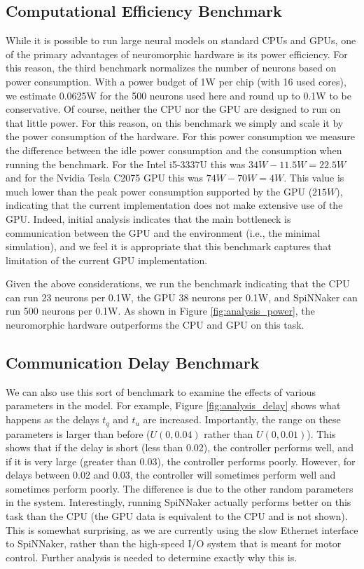 \documentclass{frontiersSCNS} %
\begin{document}
\subsection{Computational Efficiency Benchmark}

While it is possible to run large neural models on standard CPUs and GPUs,
one of the primary advantages of neuromorphic hardware is its power
efficiency.  For this reason, the third benchmark normalizes the number of neurons
based on power consumption.  With a power budget of 1W per chip (with 16 used cores),
we estimate 0.0625W for the 500 neurons used here and round up to 0.1W to be
conservative.  Of course, neither the CPU nor the
GPU are designed to run on that little power.  For this reason,
on this benchmark we simply and scale it by the power consumption of the hardware.
For this power consumption we measure the difference between the idle power
consumption and the consumption when running the benchmark.  For the Intel
i5-3337U this was $34W - 11.5W = 22.5W$ and for the Nvidia Tesla C2075 GPU
this was $74W - 70W = 4W$.  This value is much lower than the peak power
consumption supported by the GPU ($215W$), indicating that the current implementation
does not make extensive use of the GPU.  Indeed, initial analysis indicates that
the main bottleneck is communication between the GPU and the environment (i.e.,
the minimal simulation), and we feel it is appropriate that this benchmark
captures that limitation of the current GPU implementation.

Given the above considerations, we run the benchmark indicating that the CPU can run 23 neurons per 0.1W,
the GPU 38 neurons per 0.1W, and SpiNNaker can run 500 neurons per 0.1W.  
As shown in Figure \ref{fig:analysis_power}, the neuromorphic hardware
outperforms the CPU and GPU on this task.

\subsection{Communication Delay Benchmark}

We can also use this sort of benchmark to examine the effects of various
parameters in the model.  For example, Figure \ref{fig:analysis_delay}
shows what happens as the delays $t_q$ and $t_u$ are increased.
Importantly, the range on these parameters is larger than before ($U(0, 0.04)$
rather than $U(0, 0.01)$).  This shows that if the delay is short (less than 0.02), the controller performs well, and if it is very large (greater than 0.03),
the controller performs poorly.  However, for delays between 0.02 and 0.03,
the controller will sometimes perform well and sometimes perform poorly.  The
difference is due to the other random parameters in the system.  Interestingly,
running SpiNNaker actually performs better on this
task than the CPU (the GPU data is equivalent to the CPU and is not shown).  
This is somewhat surprising, as we are currently using the slow
Ethernet interface to SpiNNaker, rather than the high-speed I/O system that
is meant for motor control.  Further analysis is needed to determine exactly why this is.
\end{document}
